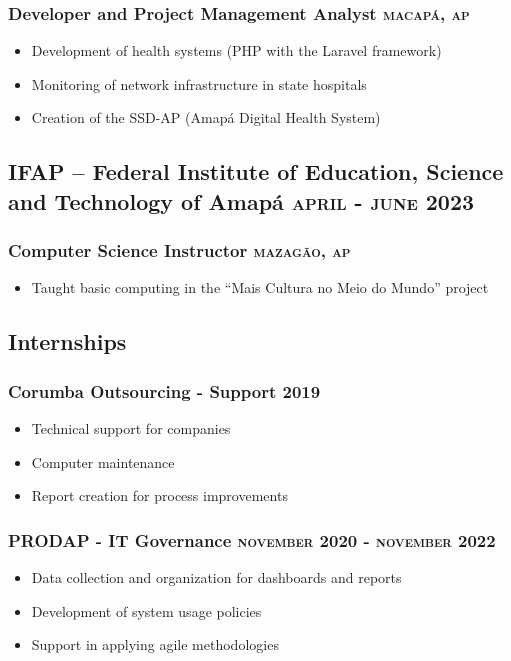 \documentclass{article}
\newcommand{\rside}[1]{\hfill \normalfont\scshape\MakeLowercase{#1}}
\begin{document}
\subsubsection{Developer and Project Management Analyst \rside{Macapá, AP}}
\begin{itemize}
  \item Development of health systems (PHP with the Laravel framework)
  \item Monitoring of network infrastructure in state hospitals
  \item Creation of the SSD-AP (Amapá Digital Health System)
\end{itemize}

\subsection{IFAP – Federal Institute of Education, Science and Technology of Amapá \rside{April - June 2023}}
\subsubsection{Computer Science Instructor \rside{Mazagão, AP}}
\begin{itemize}
  \item Taught basic computing in the “Mais Cultura no Meio do Mundo” project
\end{itemize}

\subsection{Internships}
\subsubsection{Corumba Outsourcing - Support \rside{2019}}
\begin{itemize}
  \item Technical support for companies
  \item Computer maintenance
  \item Report creation for process improvements
\end{itemize}
\subsubsection{PRODAP - IT Governance \rside{November 2020 - November 2022}}
\begin{itemize}
  \item Data collection and organization for dashboards and reports
  \item Development of system usage policies
  \item Support in applying agile methodologies
\end{itemize}
\end{document}
